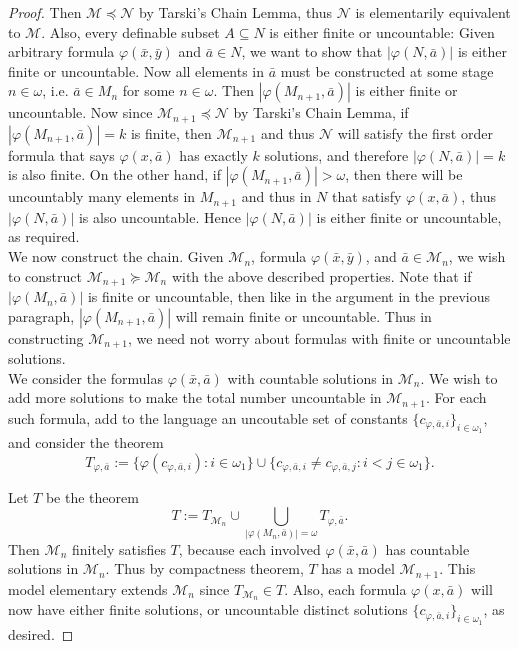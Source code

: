 \documentclass{article}
\begin{document}
\begin{enumerate}[label={\bf Q\arabic*:}]
\begin{proof}
      Then $\mathcal{M}\preceq\mathcal{N}$ by Tarski's Chain Lemma, thus
      $\mathcal{N}$ is elementarily equivalent to $\mathcal{M}$. Also,
      every definable subset $A\subseteq N$ is either finite or
      uncountable: Given arbitrary formula $\varphi(\bar{x},\bar{y})$ and
      $\bar{a}\in N$, we want to show that $|\varphi(N,\bar{a})|$ is
      either finite or uncountable. Now all elements in $\bar{a}$ must be
      constructed at some stage $n\in\omega$, i.e. $\bar{a}\in M_n$ for
      some $n\in\omega$. Then $|\varphi(M_{n+1},\bar{a})|$ is either finite
      or uncountable. Now since $\mathcal{M}_{n+1}\preceq\mathcal{N}$ by
      Tarski's Chain Lemma, if $|\varphi(M_{n+1},\bar{a})|=k$ is finite, then
      $\mathcal{M}_{n+1}$ and thus $\mathcal{N}$ will satisfy the first
      order formula that says $\varphi(x,\bar{a})$ has exactly $k$
      solutions, and therefore $|\varphi(N,\bar{a})|=k$ is also finite. On
      the other hand, if $|\varphi(M_{n+1},\bar{a})|>\omega$, then there
      will be uncountably many elements in $M_{n+1}$ and thus in $N$ that
      satisfy $\varphi(x,\bar{a})$, thus $|\varphi(N,\bar{a})|$ is also
      uncountable. Hence $|\varphi(N,\bar{a})|$ is either finite or
      uncountable, as required. \\

      We now construct the chain. Given $\mathcal{M}_n$, formula
      $\varphi(\bar{x},\bar{y})$, and $\bar{a}\in\mathcal{M}_n$, we wish to
      construct $\mathcal{M}_{n+1}\succeq\mathcal{M}_n$ with the above
      described properties. Note that if $|\varphi(M_n,\bar{a})|$ is finite
      or uncountable, then like in the argument in the previous paragraph,
      $|\varphi(M_{n+1},\bar{a})|$ will remain finite or uncountable. Thus
      in constructing $\mathcal{M}_{n+1}$, we need not worry about formulas
      with finite or uncountable solutions. \\

      We consider the formulas $\varphi(\bar{x},\bar{a})$ with countable
      solutions in $\mathcal{M}_n$. We wish to add more solutions to make
      the total number uncountable in $\mathcal{M}_{n+1}$. For each such
      formula, add to the language an uncoutable set of constants
      $\{c_{\varphi,\bar{a},i}\}_{i\in\omega_1}$, and consider the theorem
      \[T_{\varphi,\bar{a}}:= \{\varphi(c_{\varphi,\bar{a},i}):
        i\in\omega_1\} \cup \{c_{\varphi,\bar{a},i}\neq
        c_{\varphi,\bar{a},j}: i<j\in\omega_1\}.\]

      Let $T$ be the theorem
      \[T:= T_{\mathcal{M}_n}\cup \bigcup_{|\varphi(M_n,\bar{a})|=\omega}
        T_{\varphi,\bar{a}}.\]
      Then $\mathcal{M}_n$ finitely satisfies $T$, because each involved
      $\varphi(\bar{x},\bar{a})$ has countable solutions in
      $\mathcal{M}_n$. Thus by compactness theorem, $T$ has a model
      $\mathcal{M}_{n+1}$. This model elementary extends $\mathcal{M}_n$
      since $T_{\mathcal{M}_n}\in T$. Also, each formula
      $\varphi(x,\bar{a})$ will now have either finite solutions, or
      uncountable distinct solutions
      $\{c_{\varphi,\bar{a},i}\}_{i\in\omega_1}$, as desired.
    \end{proof}
\end{enumerate}
\end{document}
